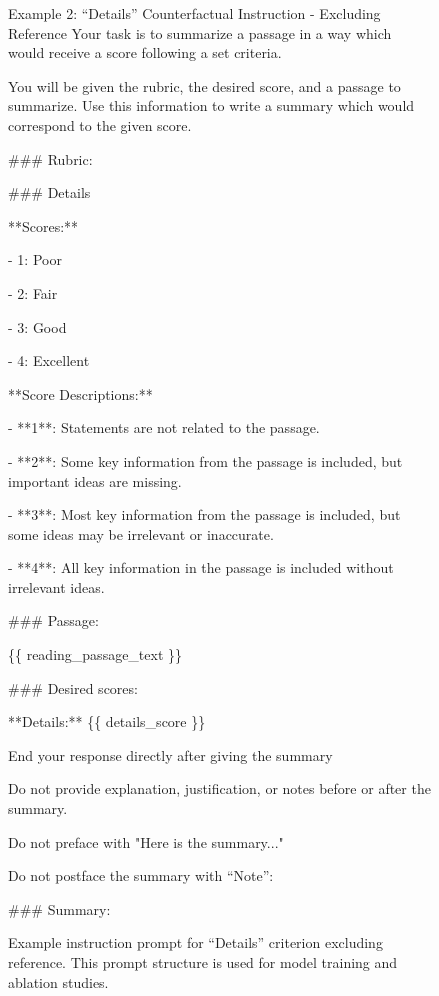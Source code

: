 \begin{figure}
\begin{promptbox}{Example 2: ``Details'' Counterfactual Instruction - Excluding Reference}
Your task is to summarize a passage in a way which would receive a score following a set criteria.


You will be given the rubric, the desired score, and a passage to summarize. Use this information to write a summary which would correspond to the given score.


\#\#\# Rubric:

\#\#\# Details

**Scores:**

- 1: Poor

- 2: Fair

- 3: Good

- 4: Excellent

**Score Descriptions:**

- **1**: Statements are not related to the passage.

- **2**: Some key information from the passage is included, but important ideas are missing.

- **3**: Most key information from the passage is included, but some ideas may be irrelevant or inaccurate.

- **4**: All key information in the passage is included without irrelevant ideas.


\#\#\# Passage:

\{\{ reading\_passage\_text \}\}

\#\#\# Desired scores:

**Details:** \{\{ details\_score \}\}

End your response directly after giving the summary

Do not provide explanation, justification, or notes before or after the summary.

Do not preface with "Here is the summary..."

Do not postface the summary with ``Note'':

\#\#\# Summary:
\end{promptbox}
\caption{Example instruction prompt for ``Details'' criterion excluding reference. This prompt structure is used for model training and ablation studies.}
\label{fig:exc_prompt}
\end{figure}
